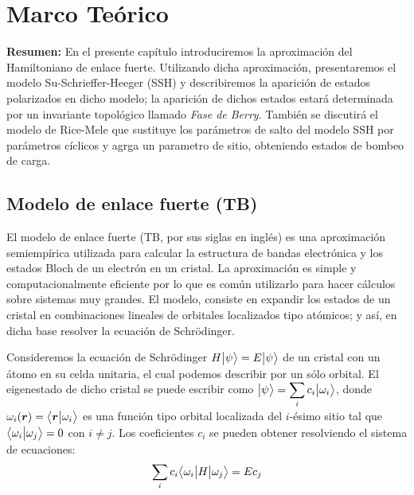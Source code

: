 \chapter{Marco Teórico}

\begin{center}
\begin{minipage}{0.9\textwidth}
{\small
{\bf Resumen:} En el presente capítulo introduciremos la aproximación del Hamiltoniano de enlace fuerte. Utilizando dicha aproximación, presentaremos el modelo Su-Schrieffer-Heeger (SSH) y describiremos la aparición de estados polarizados en dicho modelo; la aparición de dichos estados estará determinada por un invariante topológico llamado \textit{Fase de Berry}. También se discutirá el modelo de Rice-Mele que sustituye los parámetros de salto del modelo SSH por parámetros cíclicos y agrga un parametro de sitio, obteniendo estados de bombeo de carga.
}
\end{minipage}
\end{center}

    
    \section{Modelo de enlace fuerte (TB)}
    El modelo de enlace fuerte (TB, por sus siglas en inglés) es una aproximación semiempírica utilizada para calcular la estructura de bandas electrónica y los estados Bloch de un electrón en un cristal. La aproximación es simple y computacionalmente eficiente por lo que es común utilizarlo para hacer cálculos sobre sistemas muy grandes.
    El modelo, consiste en expandir los estados de un cristal en combinaciones lineales de orbitales localizados tipo atómicos; y así, en dicha base resolver la ecuación de Schrödinger.
    
    Consideremos la ecuación de Schrödinger $H \big |{\psi}\big \rangle = E \big |{\psi}\big \rangle$ de un cristal con un átomo en su celda unitaria, el cual podemos describir por un sólo orbital. El eigenestado de dicho cristal se puede escribir como $\big |{\psi}\big \rangle = \displaystyle 
    \sum_{i} c_i \big |{\omega_i}\big \rangle$, donde $\omega_i(\boldsymbol{r})=\big \langle{\boldsymbol{r}}\big | {\omega_i} \big \rangle$ es una función tipo orbital localizada del $i$-ésimo sitio tal que $\big \langle{\omega_i}\big | {\omega_j} \big \rangle = 0$  con $i \neq j$. Los coeficientes $c_i$ se pueden obtener resolviendo el sistema de ecuaciones:
    \begin{equation} 
        \label{eq:Hopping_no_ortogonal}
        \sum_i c_i \big \langle{\omega_i}\big | {H} \big | {\omega_j} \big \rangle = E c_j
    \end{equation}
    
